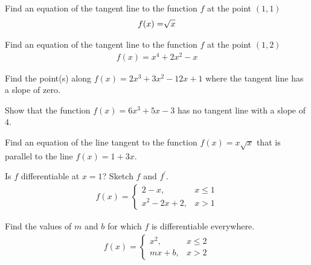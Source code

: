 \begin{exercise}
Find an equation of the tangent line to the function $f$ at the point $(1,1)$
\begin{align*}
    f(x) = \sqrt[\leftroot{2}\uproot{2}]{x}
\end{align*}
\end{exercise}

\begin{exercise}
Find an equation of the tangent line to the function $f$ at the point $(1,2)$
\begin{align*}
    f(x) = x^{4} + 2x^{2} - x
\end{align*}
\end{exercise}

\begin{exercise}
Find the point(s) along $f(x) = 2x^{3} + 3x^{2} -12x + 1$ where the tangent line has a slope of zero. 
\end{exercise}

\begin{exercise}
Show that the function $f(x) = 6x^{3} + 5x - 3$ has no tangent line with a slope of $4$.
\end{exercise}

\begin{exercise}
Find an equation of the line tangent to the function $f(x) = x\sqrt{x}$ that is parallel to the line $f(x) = 1 + 3x$.
\end{exercise}

\begin{exercise}
Is $f$ differentiable at $x=1$? Sketch $f$ and $f^{'}$.
\begin{align*}
    f(x) = \begin{cases}
    2-x, &x\leq 1\\[2ex]
    x^{2} - 2x + 2, &x> 1
    \end{cases}
\end{align*}
\end{exercise}

\begin{exercise}
Find the values of $m$ and $b$ for which $f$ is differentiable everywhere.
\begin{align*}
    f(x) = \begin{cases}
    x^{2}, &x\leq 2\\[2ex]
    mx + b, &x>2
    \end{cases}
\end{align*}
\end{exercise}